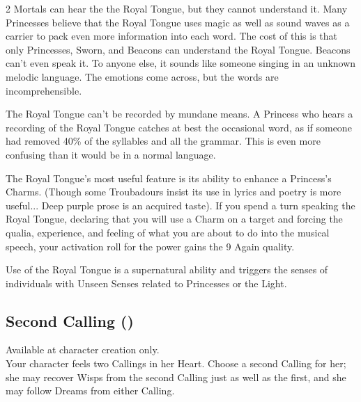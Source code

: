 \begin{multicols}{2}
Mortals can hear the the Royal Tongue, but they cannot understand it. Many Princesses believe that the Royal Tongue uses magic as well as sound waves as a carrier to pack even more information into each word. The cost of this is that only Princesses, Sworn, and Beacons can understand the Royal Tongue. Beacons can't even speak it. To anyone else, it sounds like someone singing in an unknown melodic language. The emotions come across, but the words are incomprehensible. 

The Royal Tongue can't be recorded by mundane means. A Princess who hears a recording of the Royal Tongue catches at best the occasional word, as if someone had removed 40\% of the syllables and all the grammar. This is even more confusing than it would be in a normal language.

The Royal Tongue's most useful feature is its ability to enhance a Princess's Charms. (Though some Troubadours insist its use in lyrics and poetry is more useful... Deep purple prose is an acquired taste). If you spend a turn speaking the Royal Tongue, declaring that you will use a Charm on a target and forcing the qualia, experience, and feeling of what you are about to do into the musical speech, your activation roll for the power gains the 9 Again quality. 

Use of the Royal Tongue is a supernatural ability and triggers the senses of individuals with Unseen Senses related to Princesses or the Light.

\subsection*{Second Calling (\textbullet\textbullet)}

Available at character creation only.\\

\noindent Your character feels two Callings in her Heart. Choose a second Calling for her; she may recover Wisps from the second Calling just as well as the first, and she may follow Dreams from either Calling. 


\end{multicols}
